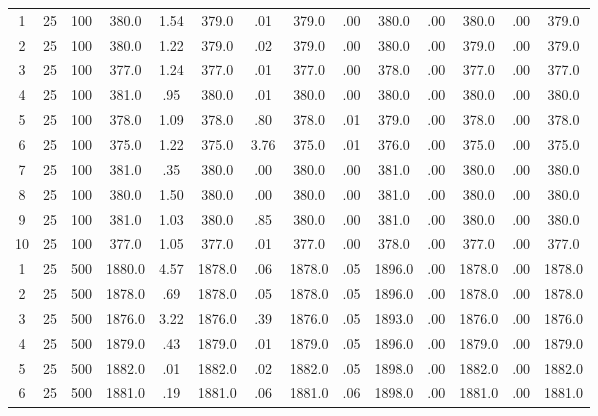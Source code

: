 \documentclass[12pt,a4paper]{article}
\begin{document}
\begin{center}
{\begin{tabular}{|ccc|cc|cc|cc|cc|cc|c|}
1             &  25& 100&    380.0& 1.54&    379.0&  .01&    379.0&  .00&    380.0&  .00&    380.0&  .00&    379.0\\[-0.01in]
2             &  25& 100&    380.0& 1.22&    379.0&  .02&    379.0&  .00&    380.0&  .00&    379.0&  .00&    379.0\\[-0.01in]
3             &  25& 100&    377.0& 1.24&    377.0&  .01&    377.0&  .00&    378.0&  .00&    377.0&  .00&    377.0\\[-0.01in]
4             &  25& 100&    381.0&  .95&    380.0&  .01&    380.0&  .00&    380.0&  .00&    380.0&  .00&    380.0\\[-0.01in]
5             &  25& 100&    378.0& 1.09&    378.0&  .80&    378.0&  .01&    379.0&  .00&    378.0&  .00&    378.0\\[-0.01in]
6             &  25& 100&    375.0& 1.22&    375.0& 3.76&    375.0&  .01&    376.0&  .00&    375.0&  .00&    375.0\\[-0.01in]
7             &  25& 100&    381.0&  .35&    380.0&  .00&    380.0&  .00&    381.0&  .00&    380.0&  .00&    380.0\\[-0.01in]
8             &  25& 100&    380.0& 1.50&    380.0&  .00&    380.0&  .00&    381.0&  .00&    380.0&  .00&    380.0\\[-0.01in]
9             &  25& 100&    381.0& 1.03&    380.0&  .85&    380.0&  .00&    381.0&  .00&    380.0&  .00&    380.0\\[-0.01in]
10            &  25& 100&    377.0& 1.05&    377.0&  .01&    377.0&  .00&    378.0&  .00&    377.0&  .00&    377.0\\[-0.01in]
1             &  25& 500&   1880.0& 4.57&   1878.0&  .06&   1878.0&  .05&   1896.0&  .00&   1878.0&  .00&   1878.0\\[-0.01in]
2             &  25& 500&   1878.0&  .69&   1878.0&  .05&   1878.0&  .05&   1896.0&  .00&   1878.0&  .00&   1878.0\\[-0.01in]
3             &  25& 500&   1876.0& 3.22&   1876.0&  .39&   1876.0&  .05&   1893.0&  .00&   1876.0&  .00&   1876.0\\[-0.01in]
4             &  25& 500&   1879.0&  .43&   1879.0&  .01&   1879.0&  .05&   1896.0&  .00&   1879.0&  .00&   1879.0\\[-0.01in]
5             &  25& 500&   1882.0&  .01&   1882.0&  .02&   1882.0&  .05&   1898.0&  .00&   1882.0&  .00&   1882.0\\[-0.01in]
6             &  25& 500&   1881.0&  .19&   1881.0&  .06&   1881.0&  .06&   1898.0&  .00&   1881.0&  .00&   1881.0\\[-0.01in]

\end{tabular}}
\end{center}
\end{document}
